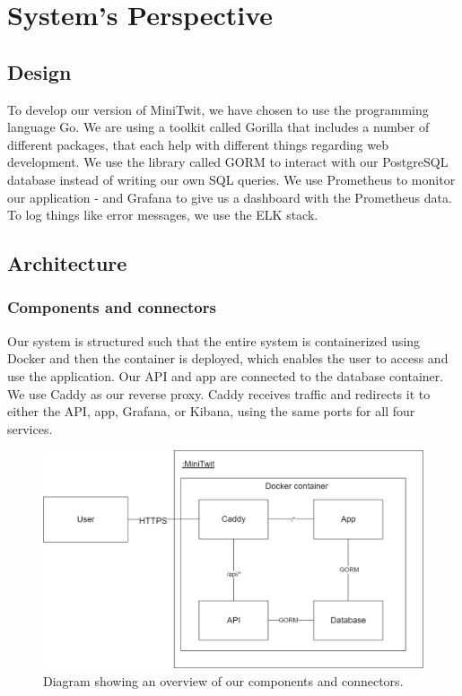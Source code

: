 \section{System's Perspective}

\subsection{Design}
To develop our version of MiniTwit, we have chosen to use the programming language Go. We are using a toolkit called Gorilla that includes a number of different packages, that each help with different things regarding web development. We use the library called GORM to interact with our PostgreSQL database instead of writing our own SQL queries. We use Prometheus to monitor our application - and Grafana to give us a dashboard with the Prometheus data. To log things like error messages, we use the ELK stack.


\subsection{Architecture}

\subsubsection{Components and connectors}
Our system is structured such that the entire system is containerized using Docker and then the container is deployed, which enables the user to access and use the application.
Our API and app are connected to the database container. We use Caddy as our reverse proxy. Caddy receives traffic and redirects it to either the API, app, Grafana, or Kibana, using the same ports for all four services.

\begin{figure}[H]
    \centering
    \includegraphics[scale=0.40]{images/C&C_diagram.png}
    \caption{Diagram showing an overview of our components and connectors.}
    \label{fig:CCDiagram}
\end{figure}

